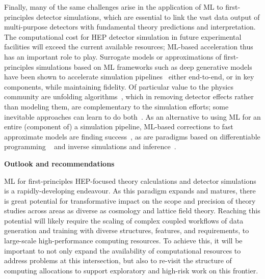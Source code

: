 \documentclass[submission,Phys]{SciPost}
\begin{document}
\begin{comment}
\begin{itemize}
    \item Surrogate models, either end-to-end or for pieces of the pipeline ~\cite{Adelmann:2022ozp,Butter:2022rso}~\cite{Butter:2022rso}
    \item Learn corrections to fast approximate models with ML~\cite{Adelmann:2022ozp}
    \item Differentiable programming ~\cite{Adelmann:2022ozp}
    \item Inverse simulations and inference~\cite{Butter:2022rso}
\end{itemize}
\end{comment}

Finally, many of the same challenges arise in the application of ML to first-principles detector simulations, which are essential to link the vast data output of multi-purpose detectors with fundamental theory predictions and interpretation. The computational cost for HEP detector simulation in future experimental facilities will exceed the current available resources; ML-based acceleration thus has an important role to play. Surrogate models or approximations of first-principles simulations based on ML frameworks such as deep generative models have been shown to accelerate simulation pipelines~\cite{Adelmann:2022ozp,Butter:2022rso} either end-to-end, or in key components, while maintaining fidelity.  Of particular value to the physics community are unfolding algorithms~\cite{Andreassen:2019cjw}, which in removing detector effects rather than modeling them, are complementary to the simulation efforts; some inevitable approaches can learn to do both~\cite{Bellagente:2020piv, Howard:2022rhf}. As an alternative to using ML for an entire (component of) a simulation pipeline, ML-based corrections to fast approximate models are finding success~\cite{Adelmann:2022ozp}, as are paradigms based on differentiable programming ~\cite{Adelmann:2022ozp} and inverse simulations and inference~\cite{Butter:2022rso}.

{\bf Outlook and recommendations}

ML for first-principles HEP-focused theory calculations and detector simulations is a rapidly-developing endeavour. As this paradigm expands and matures, there is great potential for transformative impact on the scope and precision of theory studies across areas as diverse as cosmology and lattice field theory. Reaching this potential will likely require the scaling of complex coupled workflows of data generation and training with diverse structures, features, and requirements, to large-scale high-performance computing resources. To achieve this, it will be important to not only expand the availability of computational resources to address problems at this intersection, but also to re-visit the structure of computing allocations to support exploratory and high-risk work on this frontier.
\end{document}
